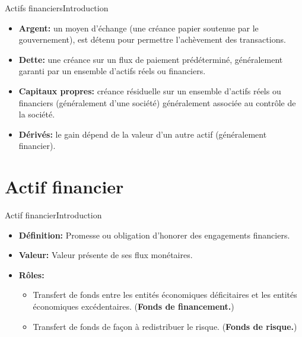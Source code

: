 \documentclass{beamer}
\begin{document}
\begin{frame}{Actifs financiers}{Introduction}
\begin{itemize}
\item \textbf{Argent:} un moyen d'échange (une créance papier soutenue par le gouvernement), est détenu pour permettre l'achèvement des transactions.
\item \textbf{Dette:} une créance sur un flux de paiement prédéterminé, généralement garanti par un ensemble d'actifs réels ou financiers.
\item \textbf{Capitaux propres:} créance résiduelle sur un ensemble d'actifs réels ou financiers (généralement d'une société) généralement associée au contrôle de la société.
\item \textbf{Dérivés:} le gain dépend de la valeur d'un autre actif (généralement financier).
\end{itemize}
\end{frame}

\section{Actif financier}
\begin{frame}{Actif financier}{Introduction}
\begin{itemize}
\item \textbf{Définition:} Promesse ou obligation d’honorer des engagements financiers.
\item \textbf{Valeur:} Valeur présente de ses flux monétaires.
\item  \textbf{Rôles:}
\begin{itemize}
\item Transfert de fonds entre les entités économiques déficitaires et les entités économiques excédentaires.  (\textbf{Fonds de financement.})
\vspace{0.5cm}
\item Transfert de fonds de façon à redistribuer le
risque.  (\textbf{Fonds de risque.})
\end{itemize}
\end{itemize}
\end{frame}
\end{document}

